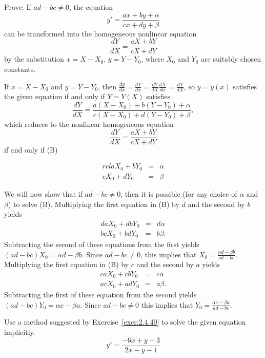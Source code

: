 \documentclass{ximera}
\begin{document}
\begin{problem}\label{exer:2.4.40}
Prove:  If $ad-bc\neq 0$, the equation
$$
y'=\frac{ax+by+\alpha}{cx+dy+\beta}
$$
can be transformed into the homogeneous nonlinear equation
$$
\frac{dY}{dX}=\frac{aX+bY}{cX+dY}
$$
by the substitution $x=X-X_0,\,  y=Y-Y_0$,
where $X_0$ and $Y_0$ are suitably chosen constants.



\begin{solution}
    If $x=X-X_0$ and $y=Y-Y_0$, then $\frac{dy}{ dx}=\frac{dY}{
dx}=\frac{dY}{ dX}\frac{dX}{ dx}=\frac{dY}{ dX}$, so $y=y(x)$
satisfies the given equation if and only if $Y=Y(X)$ satisfies
 $$
\frac{dY}{ dX}=\frac{a(X-X_0)+b(Y-Y_0)+\alpha}{
c(X-X_0)+d(Y-Y_0)+\beta},
$$
 which reduces to the nonlinear homogeneous equation
$$
\frac{dY}{ dX}=\frac{aX+bY}{ cX+dY}
$$
 if and only if (B)

\begin{eqnarray*}{rcl}
aX_0+bY_0&=&\alpha\\
cX_0+dY_0&=&\beta
\end{eqnarray*}

We will now show that
if $ad-bc\neq 0$, then it is possible (for any choice of $\alpha$
and $\beta$) to solve (B).
Multiplying the first equation in (B) by $d$ and
 the second by  $b$ yields
\begin{eqnarray*}
daX_0+dbY_0&=&d\alpha  \\
bcX_0+bdY_0&=&b\beta.
\end{eqnarray*}
Subtracting the second of these equations from the first yields
 $(ad-bc)X_0=\alpha d-\beta b$.
Since $ad-bc\neq 0$, this implies that $X_0=\frac{\alpha d-\beta b}{
ad-bc}$. Multiplying the first equation in (B) by
$c$ and the second by $a$ yields
\begin{eqnarray*}
caX_0+cbY_0&=&c\alpha  \\
acX_0+adY_0&=&a\beta.
\end{eqnarray*}
Subtracting the first of these equation from the second yields
 $(ad-bc)Y_0=\alpha c-\beta a$. Since $ad-bc\ne0$ this implies that
$Y_0=\frac{\alpha c-\beta a}{ ad-bc}$.
\end{solution}
\end{problem}

\begin{problem}\label{exer:2.4.41} Use a method suggested by Exercise~\ref{exer:2.4.40} to solve the
given equation implicitly.
$$y'=\frac{-6x+y-3}{2x-y-1}$$
\end{problem}
\end{document}
